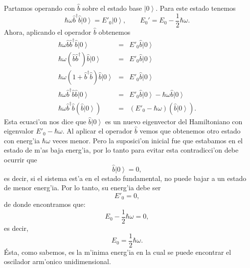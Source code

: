 Partamos operando con $\hat{b}$ sobre el estado base $\left|
0\right> .$ Para este estado tenemos%
\begin{equation}
\hbar\omega\hat{b}^{\dagger}\hat{b}\left| 0\right> =E'
_{0}\left| 0\right> , \qquad E_{0}'=E_{0}-\frac{1}{2}\hbar\omega .
\end{equation}
Ahora, aplicando el operador $\hat{b}$ obtenemos
\begin{eqnarray}
\hbar\omega\hat{b}\hat{b}^{\dagger}\hat{b}\left| 0\right> & = &E'
_{0}\hat{b}\left| 0\right> \\
\hbar\omega\left( \hat{b}\hat{b}^{\dagger}\right) \hat{b}\left|
0\right> & = &E'
_{0}\hat{b}\left| 0\right> \\
\hbar\omega\left( 1+\hat{b}^{\dagger}\hat{b}\right) \hat{b}\left|
0\right> & = &E'
_{0}\hat{b}\left| 0\right> \\
\hbar\omega\hat{b}^{\dagger}\hat{b}\hat{b}\left| 0\right> & = &E'
_{0}\hat{b}\left| 0\right> -\hbar\omega\hat{b}\left|
0\right> \\
\hbar\omega\hat{b}^{\dagger}\hat{b}\left( \hat{b}\left| 0\right>
\right) & = &\left( E'
_{0}-\hbar\omega\right) \left( \hat{b}\left| 0\right> \right) .
\end{eqnarray}
Esta ecuaci'on nos dice que $\hat{b}\left| 0\right> $ es un nuevo
eigenvector del Hamiltoniano con eigenvalor $E'_{0}-\hbar\omega$.
Al aplicar el operador $\hat{b}$ vemos que obtenemos otro
estado con energ'ia $\hbar\omega$ veces menor$.$ Pero la suposici'on
inicial fue que estabamos en el estado de m'as baja energ'ia, por lo
tanto para evitar esta contradicci'on debe ocurrir que%
\begin{equation}
\hat{b}\left| 0\right> =0\label{EstadoFundamental} ,
\end{equation}
es decir, si el sistema est'a en el estado fundamental, no puede bajar a un
estado de menor energ'ia. Por lo tanto, su energ'ia debe ser%
\begin{equation}
E'_{0}=0 ,
\end{equation}
de donde encontramos que:%
\begin{equation}
E_{0}-\frac{1}{2}\hbar\omega  =0 ,
\end{equation}
es decir,
\begin{equation}
E_{0}  =\frac{1}{2}\hbar\omega .
\end{equation}
Ésta, como sabemos, es la m'inima energ'ia en la cual se puede encontrar
el oscilador arm'onico unidimensional.

